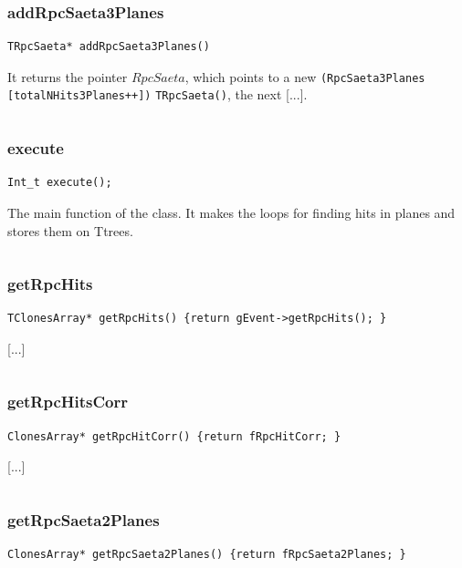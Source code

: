 \documentclass[a4paper]{book}
\begin{document}
\subsubsection{addRpcSaeta3Planes}

\begin{lstlisting}
TRpcSaeta* addRpcSaeta3Planes()
\end{lstlisting}

It returns the pointer $RpcSaeta$, which points to a new \texttt{(RpcSaeta3Planes} \texttt{[totalNHits3Planes++])} \texttt{TRpcSaeta()}, the next [...].

\[\]

\subsubsection{execute}

\begin{lstlisting}
Int_t execute();
\end{lstlisting}

The main function of the class. It makes the loops for finding hits in planes and stores them on Ttrees.

\[\]

\subsubsection{getRpcHits}

\begin{lstlisting}
TClonesArray* getRpcHits() {return gEvent->getRpcHits(); }
\end{lstlisting}

[...]

\[\]

\subsubsection{getRpcHitsCorr}

\begin{lstlisting}
ClonesArray* getRpcHitCorr() {return fRpcHitCorr; }
\end{lstlisting}

[...]

\[\]

\subsubsection{getRpcSaeta2Planes}

\begin{lstlisting}
ClonesArray* getRpcSaeta2Planes() {return fRpcSaeta2Planes; }
\end{lstlisting}
\end{document}
